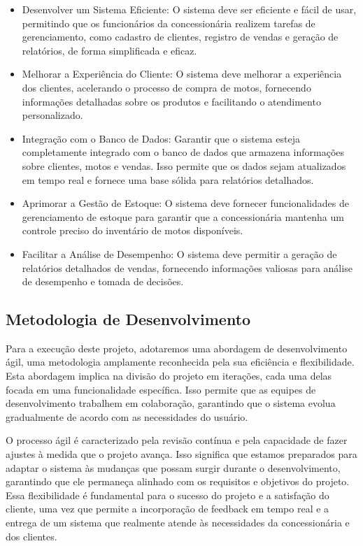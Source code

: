 \begin{itemize}
	\item Desenvolver um Sistema Eficiente: O sistema deve ser eficiente e fácil de usar, permitindo que os funcionários da concessionária realizem tarefas de gerenciamento, como cadastro de clientes, registro de vendas e geração de relatórios, de forma simplificada e eficaz.
	
	\item Melhorar a Experiência do Cliente: O sistema deve melhorar a experiência dos clientes, acelerando o processo de compra de motos, fornecendo informações detalhadas sobre os produtos e facilitando o atendimento personalizado.
	
	\item Integração com o Banco de Dados: Garantir que o sistema esteja completamente integrado com o banco de dados que armazena informações sobre clientes, motos e vendas. Isso permite que os dados sejam atualizados em tempo real e fornece uma base sólida para relatórios detalhados.
	
	\item Aprimorar a Gestão de Estoque: O sistema deve fornecer funcionalidades de gerenciamento de estoque para garantir que a concessionária mantenha um controle preciso do inventário de motos disponíveis.
	
	\item Facilitar a Análise de Desempenho: O sistema deve permitir a geração de relatórios detalhados de vendas, fornecendo informações valiosas para análise de desempenho e tomada de decisões.
\end{itemize}

\subsection{Metodologia de Desenvolvimento}

Para a execução deste projeto, adotaremos uma abordagem de desenvolvimento ágil, uma metodologia amplamente reconhecida pela sua eficiência e flexibilidade. Esta abordagem implica na divisão do projeto em iterações, cada uma delas focada em uma funcionalidade específica. Isso permite que as equipes de desenvolvimento trabalhem em colaboração, garantindo que o sistema evolua gradualmente de acordo com as necessidades do usuário.

O processo ágil é caracterizado pela revisão contínua e pela capacidade de fazer ajustes à medida que o projeto avança. Isso significa que estamos preparados para adaptar o sistema às mudanças que possam surgir durante o desenvolvimento, garantindo que ele permaneça alinhado com os requisitos e objetivos do projeto. Essa flexibilidade é fundamental para o sucesso do projeto e a satisfação do cliente, uma vez que permite a incorporação de feedback em tempo real e a entrega de um sistema que realmente atende às necessidades da concessionária e dos clientes.

